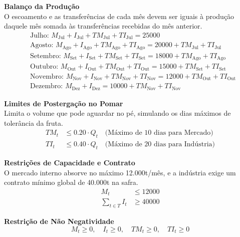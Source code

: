 \documentclass[12pt, a4paper]{article}
\begin{document}
\textbf{Balanço da Produção} \\
O escoamento e as transferências de cada mês devem ser iguais à produção daquele mês somada às transferências recebidas do mês anterior.
\begin{align*}
    &\text{Julho: } M_{\text{Jul}} + I_{\text{Jul}} + TM_{\text{Jul}} + TI_{\text{Jul}} = 25000 \\
    &\text{Agosto: } M_{\text{Ago}} + I_{\text{Ago}} + TM_{\text{Ago}} + TI_{\text{Ago}} = 20000 + TM_{\text{Jul}} + TI_{\text{Jul}} \\
    &\text{Setembro: } M_{\text{Set}} + I_{\text{Set}} + TM_{\text{Set}} + TI_{\text{Set}} = 18000 + TM_{\text{Ago}} + TI_{\text{Ago}} \\
    &\text{Outubro: } M_{\text{Out}} + I_{\text{Out}} + TM_{\text{Out}} + TI_{\text{Out}} = 15000 + TM_{\text{Set}} + TI_{\text{Set}} \\
    &\text{Novembro: } M_{\text{Nov}} + I_{\text{Nov}} + TM_{\text{Nov}} + TI_{\text{Nov}} = 12000 + TM_{\text{Out}} + TI_{\text{Out}} \\
    &\text{Dezembro: } M_{\text{Dez}} + I_{\text{Dez}} = 10000 + TM_{\text{Nov}} + TI_{\text{Nov}}
\end{align*}

\vspace{0.2cm}\noindent\textbf{Limites de Postergação no Pomar} \\
Limita o volume que pode aguardar no pé, simulando os dias máximos de tolerância da fruta.
\begin{align*}
    TM_t &\le 0.20 \cdot Q_t \quad \text{(Máximo de 10 dias para Mercado)} \\
    TI_t &\le 0.40 \cdot Q_t \quad \text{(Máximo de 20 dias para Indústria)}
\end{align*}

\vspace{0.2cm}\noindent\textbf{Restrições de Capacidade e Contrato} \\
O mercado interno absorve no máximo 12.000t/mês, e a indústria exige um contrato mínimo global de 40.000t na safra.
\begin{align*}
    M_t &\le 12000 \\
    \sum_{t \in T} I_t &\ge 40000
\end{align*}

\vspace{0.2cm}\noindent\textbf{Restrição de Não Negatividade}
\begin{equation*}
    M_t \ge 0, \quad I_t \ge 0, \quad TM_t \ge 0, \quad TI_t \ge 0
\end{equation*}
\end{document}
